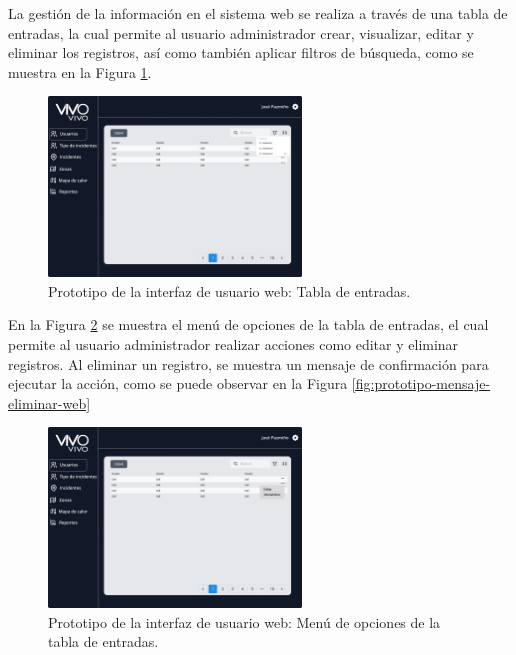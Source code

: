La gestión de la información en el sistema web se realiza a través de una tabla de entradas, la cual permite al usuario administrador crear, visualizar,
editar y eliminar los registros, así como también aplicar filtros de búsqueda, como se muestra en la Figura \ref{fig:prototipo-tabla-entradas-web}.

\begin{figure}[H]
    \centering
    \includegraphics[width=0.6\textwidth]{chapters/III-resultados-y-discusion/resources/images/prototipo-tabla-entradas-web.png}
    \caption{Prototipo de la interfaz de usuario web: Tabla de entradas.}
    \label{fig:prototipo-tabla-entradas-web}
\end{figure}

En la Figura \ref{fig:prototipo-menu-tabla-entradas-web} se muestra el menú de opciones de la tabla de entradas, el cual permite al usuario administrador
realizar acciones como editar y eliminar registros. Al eliminar un registro, se muestra un mensaje de confirmación para ejecutar la acción, como se puede
observar en la Figura \ref{fig:prototipo-mensaje-eliminar-web}

\begin{figure}[H]
    \centering
    \includegraphics[width=0.6\textwidth]{chapters/III-resultados-y-discusion/resources/images/prototipo-menu-tabla-entradas-web.png}
    \caption{Prototipo de la interfaz de usuario web: Menú de opciones de la tabla de entradas.}
    \label{fig:prototipo-menu-tabla-entradas-web}
\end{figure}

